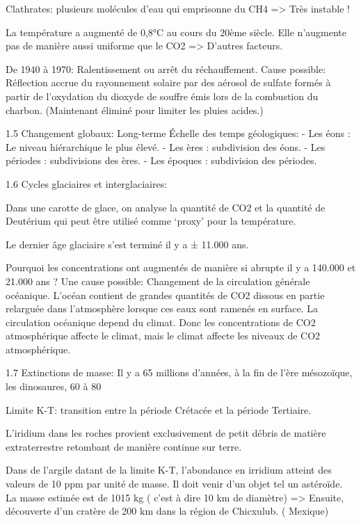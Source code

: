 Clathrates: plusieurs molécules d’eau qui emprisonne du CH4 => Très instable !




La température a augmenté de 0,8°C au cours du 20ème siècle.
Elle n’augmente pas de manière aussi uniforme que le CO2 => D’autres facteurs.


De 1940 à 1970: Ralentissement ou arrêt du réchauffement.
Cause possible: Réflection accrue du rayonnement solaire par des aérosol de sulfate formés à partir de l’oxydation du dioxyde de souffre émis lors de la combustion du charbon. (Maintenant éliminé pour limiter les pluies acides.)




  
1.5 Changement globaux: Long-terme
Échelle des temps géologiques:
- Les éons : Le niveau hiérarchique le plus élevé.
- Les ères : subdivision des éons.
- Les périodes : subdivisions des ères.
- Les époques : subdivision des périodes.






1.6 Cycles glaciaires et interglaciaires:


Dans une carotte de glace, on analyse la quantité de CO2 et la quantité de Deutérium qui peut être utilisé comme ‘proxy’ pour la température.


Le dernier âge glaciaire s’est terminé il y a ± 11.000 ans.


Pourquoi les concentrations ont augmentés de manière si abrupte il y a 140.000  et 21.000 ans ?
Une cause possible: Changement de la circulation générale océanique. L’océan contient de grandes quantités de CO2 dissous en partie relarguée dans l’atmosphère lorsque ces eaux sont ramenés en surface. La circulation océanique depend du climat.
Donc les concentrations de CO2 atmosphérique affecte le climat, mais le climat affecte les niveaux de CO2 atmosphérique.


1.7 Extinctions de masse:
Il y a 65 millions d’années, à la fin de l’ère mésozoïque, les dinosaures, 60 à 80%


Limite K-T: transition entre la période Crétacée et la période Tertiaire.


L'iridium dans les roches provient exclusivement de petit débris de matière extraterrestre retombant de manière continue sur terre.


Dans de l’argile datant de la limite K-T, l’abondance en irridium atteint des valeurs de 10 ppm par unité de masse. Il doit venir d’un objet tel un astéroïde.
La masse estimée est de 1015 kg ( c’est à dire 10 km de diamètre)
=> Ensuite, découverte d’un cratère de 200 km dans la région de Chicxulub. ( Mexique)



